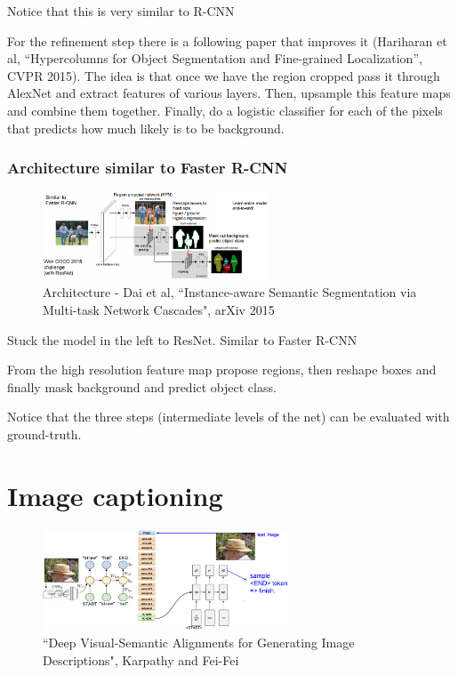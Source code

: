 Notice that this is very similar to R-CNN

For the refinement step there is a following paper that improves it (Hariharan et al, “Hypercolumns for Object Segmentation and Fine-grained Localization”, CVPR 2015). The idea is that once we have the region cropped pass it through AlexNet and extract features of various layers. Then, upsample this feature maps and combine them together. Finally, do a logistic classifier for each of the pixels that predicts how much likely is to be background.

\subsubsection*{Architecture similar to Faster R-CNN}
\begin{figure}[h]
  \centering
  \includegraphics[width=0.6\textwidth]{Images/applications/21.png}
  \caption{Architecture - Dai et al, ``Instance-aware Semantic Segmentation via Multi-task Network Cascades", arXiv 2015}
\end{figure}


Stuck the model in the left to ResNet. Similar to Faster R-CNN

From the high resolution feature map propose regions, then reshape boxes and finally mask background and predict object class.

Notice that the three steps (intermediate levels of the net) can be evaluated with ground-truth.

\section{Image captioning}
\begin{figure}[h]
  \centering
  \includegraphics[width=0.65\textwidth]{Images/applications/30.png}
  \caption{``Deep Visual-Semantic Alignments for Generating Image Descriptions", Karpathy and Fei-Fei}
\end{figure}


